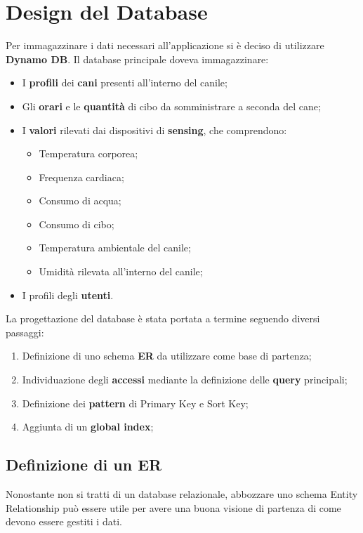 \section{Design del Database}
Per immagazzinare i dati necessari all'applicazione si è deciso di utilizzare \textbf{Dynamo DB}.
Il database principale doveva immagazzinare:
\begin{itemize}
    \item I \textbf{profili} dei \textbf{cani} presenti all'interno del canile;
    \item Gli \textbf{orari} e le \textbf{quantità} di cibo da somministrare a seconda del cane;
    \item I \textbf{valori} rilevati dai dispositivi di \textbf{sensing}, che comprendono:
    \begin{itemize}
        \item Temperatura corporea;
        \item Frequenza cardiaca;
        \item Consumo di acqua; 
        \item Consumo di cibo;
        \item Temperatura ambientale del canile;
        \item Umidità rilevata all'interno del canile;
    \end{itemize}
    \item I profili degli \textbf{utenti}.
\end{itemize}

La progettazione del database è stata portata a termine seguendo diversi passaggi:
    \begin{enumerate}
        \item Definizione di uno schema \textbf{ER} da utilizzare come base di partenza;
        \item Individuazione degli \textbf{accessi} mediante la definizione delle \textbf{query} principali;
        \item Definizione dei \textbf{pattern} di Primary Key e Sort Key;
        \item Aggiunta di un \textbf{ global index};
    \end{enumerate}
    
    \subsection{Definizione di un ER}
    Nonostante non si tratti di un database relazionale, abbozzare uno schema Entity Relationship può essere utile per avere una buona visione di partenza di come devono essere gestiti i dati.
